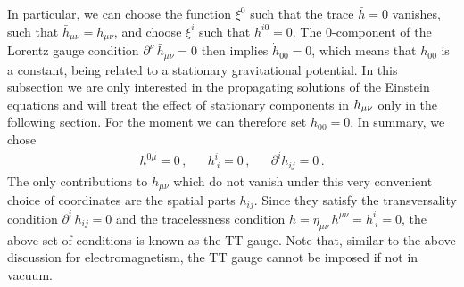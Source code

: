 In particular, we can choose the function $\xi^0$ such that the trace $\bar{h} = 0$ vanishes, such that $\bar{h}_{\mu \nu} = h_{\mu \nu}$, and choose $\xi^i$ such that $h^{i 0} = 0$. The $0$-component of the Lorentz gauge condition $\partial^\nu \, \bar{h}_{\mu \nu} = 0$ then implies $\dot{h}_{00} = 0$, which means that $h_{00}$ is a constant, being related to a stationary gravitational potential. In this subsection we are only interested in the propagating solutions of the Einstein equations and will treat the effect of stationary components in $h_{{\mu \nu}}$ only in the following section. For the moment we can therefore set $h_{00} =0$. In summary, we chose 
\begin{align}
	h^{0 \mu} = 0\, ,& &h^i_{~i} = 0\, ,& &\partial^i h_{ij} = 0 \, .
	\label{eq:TT}
\end{align}
The only contributions to $h_{\mu \nu}$ which do not vanish under this very convenient choice of coordinates are the spatial parts $h_{ij}$. Since they satisfy the transversality condition $\partial^i \, h_{ij} = 0$ and the tracelessness condition $h = \eta_{\mu \nu} \, h^{\mu \nu} = h^i_{~i} = 0$, the above set of conditions is known as the \ac{TT} gauge. Note that, similar to the above discussion for electromagnetism, the \ac{TT} gauge cannot be imposed if not in vacuum. 

